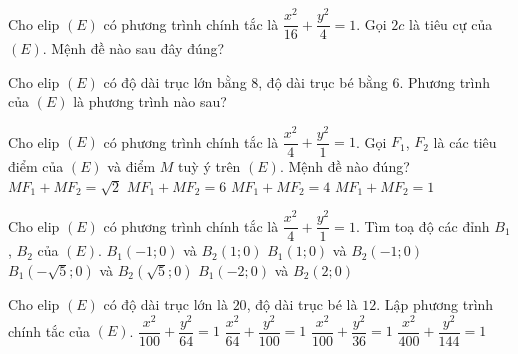 \begin{ex}%
	Cho elip $(E)$ có phương trình chính tắc là
	$\dfrac{x^2}{16}+\dfrac{y^2}{4}=1$. Gọi $2c$ là tiêu cự của
	$(E)$. Mệnh đề nào sau đây đúng?
\end{ex}
\begin{ex}%
	Cho elip $(E)$ có độ dài trục lớn bằng $8$, độ
	dài trục bé bằng $6$. Phương trình của $(E)$ là
	phương trình nào sau?
\end{ex}
\begin{ex}%
	Cho elip $(E)$ có phương trình chính tắc là $\dfrac{x^2}{4}+\dfrac{y^2}{1}=1$. Gọi $F_1$, $F_2$ là các tiêu điểm của $(E)$ và điểm $M$ tuỳ ý trên $(E)$. Mệnh đề nào đúng?
	\choice
	{ $MF_1+MF_2=\sqrt{2}$}
	{$MF_1+MF_2=6$}
	{\True $MF_1+MF_2=4$}
	{$MF_1+MF_2=1$}
\end{ex}
\begin{ex}%
	Cho elip $(E)$ có phương trình chính tắc là $\dfrac{x^2}{4}+\dfrac{y^2}{1}=1$. Tìm toạ độ các đỉnh  $B_1$, $B_2$  của $(E)$.
	\choice
	{\True $B_1(-1;0)$ và $B_2(1;0)$}
	{$B_1(1;0)$ và $B_2(-1;0)$}
	{ $B_1(-\sqrt{5};0)$ và $B_2(\sqrt{5};0)$}
	{$B_1(-2;0)$ và $B_2(2;0)$}
\end{ex}
\begin{ex}%
	Cho elip $(E)$ có  độ dài trục lớn là $20$, độ dài trục bé là $12$. Lập phương trình chính tắc của $(E)$.
	\choice
	{ $\dfrac{x^2}{100}+\dfrac{y^2}{64}=1$}
	{$\dfrac{x^2}{64}+\dfrac{y^2}{100}=1$}
	{\True $\dfrac{x^2}{100}+\dfrac{y^2}{36}=1$}
	{$\dfrac{x^2}{400}+\dfrac{y^2}{144}=1$}
\end{ex}

